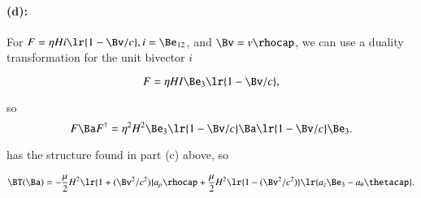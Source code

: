 \paragraph{(d):}

For \( F = \eta H i \lr{ 1 - \Bv/c }, i = \Be_{12} \), and \( \Bv = v \rhocap \), we can use a duality transformation for the unit bivector \( i \)

\begin{dmath}\label{eqn:poyntingStaticExamples:1340}
F = \eta H I \Be_3 \lr{ 1 - \Bv/c },
\end{dmath}

so
\begin{dmath}\label{eqn:poyntingStaticExamples:1360}
F \Ba F^\dagger = \eta^2 H^2 \Be_3 \lr{ 1 - \Bv/c } \Ba \lr{ 1 - \Bv/c } \Be_3.
\end{dmath}

 has the structure found in part (c) above, so

\begin{dmath}\label{eqn:poyntingStaticExamples:1380}
\BT(\Ba)
=
-\frac{\mu}{2} H^2 \lr{ 1 + (\Bv^2/c^2) } a_\rho \rhocap
+
\frac{\mu}{2} H^2 \lr{ 1 - (\Bv^2/c^2) } \lr{ a_z \Be_3 - a_\theta \thetacap }.
\end{dmath}


